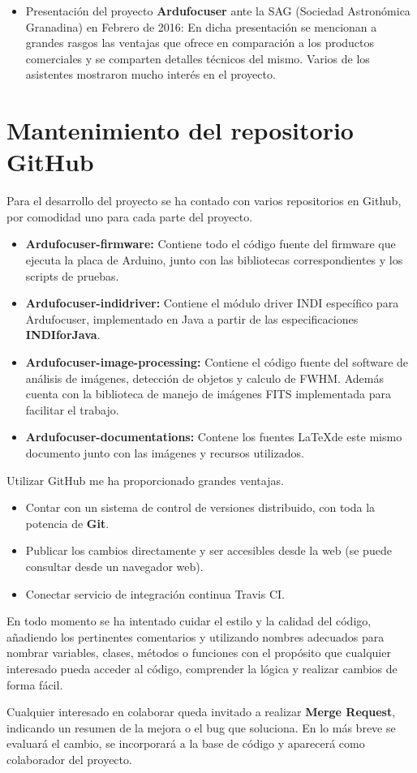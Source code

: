 \begin{itemize}
	\item Presentación del proyecto \textbf{Ardufocuser} ante la SAG (Sociedad Astronómica Granadina) \cite{sag} en Febrero de 2016: En dicha presentación se mencionan a grandes rasgos las ventajas que ofrece en comparación a los productos comerciales y se comparten detalles técnicos del mismo. Varios de los asistentes mostraron mucho interés en el proyecto.
\end{itemize}
 
 
\section{Mantenimiento del repositorio GitHub}

Para el desarrollo del proyecto se ha contado con varios repositorios en Github, por comodidad uno para cada parte del proyecto. 


\begin{itemize}
	\item \textbf{Ardufocuser-firmware:} Contiene todo el código fuente del firmware que ejecuta la placa de Arduino, junto con las bibliotecas correspondientes y los scripts de pruebas. 
	\item \textbf{Ardufocuser-indidriver:} Contiene el módulo driver INDI específico para Ardufocuser, implementado en Java a partir de las especificaciones \textbf{INDIforJava}.
	\item \textbf{Ardufocuser-image-processing:} Contiene el código fuente del software de análisis de imágenes, detección de objetos y calculo de FWHM. Además cuenta con la biblioteca de manejo de imágenes FITS implementada para facilitar el trabajo.
	\item \textbf{Ardufocuser-documentations:} Contene los fuentes  \LaTeX de este mismo documento junto con las imágenes y recursos utilizados.
\end{itemize}

Utilizar GitHub me ha proporcionado grandes ventajas.

\begin{itemize}
	\item Contar con un sistema de control de versiones distribuido, con toda la potencia de \textbf{Git}.
	\item Publicar los cambios directamente y ser accesibles desde la web (se puede consultar desde un navegador web).
	\item Conectar servicio de integración continua Travis CI.
\end{itemize}

En todo momento se ha intentado cuidar el estilo y la calidad del código, añadiendo los pertinentes comentarios y utilizando nombres adecuados para nombrar variables, clases, métodos o funciones con el propósito que cualquier interesado pueda acceder al código, comprender la lógica y realizar cambios de forma fácil.  

Cualquier interesado en colaborar queda invitado a realizar \textbf{Merge Request}, indicando un resumen de la mejora o el bug que soluciona. En lo más breve se evaluará el cambio, se incorporará a la base de código y aparecerá como colaborador del proyecto.


 
